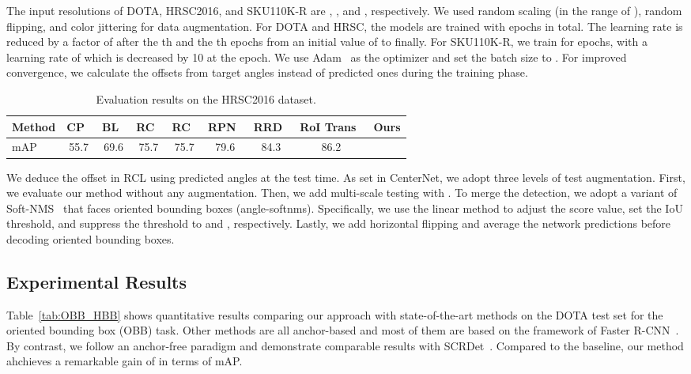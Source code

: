 \documentclass[10pt,twocolumn,letterpaper]{article}
\newcommand{\nothing}[1]{}
\renewcommand{\nothing}[1]{}
\begin{document}
The input resolutions of DOTA, HRSC2016, and SKU110K-R are , , and , respectively.
We used random scaling (in the range of ), random flipping, and color jittering for data augmentation.
For DOTA and HRSC, the models are trained with  epochs in total.
The learning rate is reduced by a factor of  after the th and the th epochs from an initial value of  to  finally.
For SKU110K-R, we train for  epochs, with a learning rate of  which is decreased by 10 at the  epoch.
We use Adam~\cite{kingma2014adam} as the optimizer and set the batch size to .
For improved convergence, we calculate the offsets from target angles instead of predicted ones during the training phase.
\begin{table*}\centering
\begin{tabular}{lccccccc|c}
\toprule
    Method &  CP~\cite{liu2017rotated} &  BL~\cite{liu2017rotated} &  RC~\cite{liu2017rotated} &  RC~\cite{liu2017rotated} &  RPN~\cite{zhang2018toward} &  RRD~\cite{liao2018rotation} &RoI Trans~\cite{ding2019learning} &  Ours  \\ \hline\hline
    mAP & 55.7 & 69.6 & 75.7 & 75.7 & 79.6 & 84.3 & 86.2 &  \\
\bottomrule
\end{tabular}
\caption{Evaluation results on the HRSC2016 dataset.}
\label{tab:hrsc}
\end{table*}
 We deduce the offset in RCL using predicted angles at the test time.
As set in CenterNet, we adopt three levels of test augmentation.
First, we evaluate our method without any augmentation.
Then, we add multi-scale testing with . To merge the detection, we adopt a variant of Soft-NMS~\cite{bodla2017soft} that faces oriented bounding boxes (angle-softnms).
Specifically, we use the linear method to adjust the score value, set the IoU threshold, and suppress the threshold to  and , respectively.
Lastly, we add horizontal flipping and average the network predictions before decoding oriented bounding boxes.

\subsection{Experimental Results}
Table~\ref{tab:OBB_HBB} shows quantitative results comparing our approach with state-of-the-art methods on the DOTA test set for the oriented bounding box (OBB) task.
Other methods are all anchor-based and most of them are based on the framework of Faster R-CNN~\cite{ren2015faster}.
By contrast, we follow an anchor-free paradigm and demonstrate comparable results with SCRDet~\cite{yang2019scrdet}\nothing{, demonstrating the competitive edge of our proposed method}.
Compared to the baseline, our method ahchieves a remarkable gain of  in terms of mAP.
\end{document}
